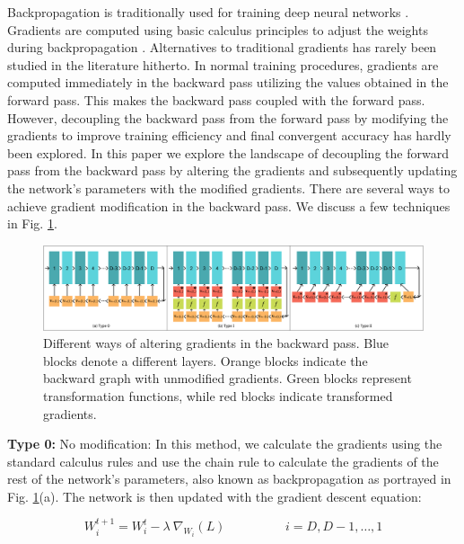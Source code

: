 \documentclass[runningheads]{llncs}
\makeatletter
\def\blfootnote{\xdef\@thefnmark{}\@footnotetext}
\makeatother
\begin{document}
\blfootnote{$^\ast \text{Equal contribution.}$}


Backpropagation is traditionally used for training deep neural networks
\cite{lillicrap2020backpropagation}. Gradients are computed using basic calculus
principles to adjust the weights during backpropagation \cite{lecun1988theoretical}.
Alternatives to traditional gradients has rarely been studied in the literature
hitherto. In normal training procedures, gradients are computed immediately in the
backward pass utilizing the values obtained in the forward pass. This makes the backward
pass coupled with the forward pass. However, decoupling the backward pass from the
forward pass by modifying the gradients to improve training efficiency and final
convergent accuracy has hardly been explored. In this paper we explore the landscape of
decoupling the forward pass from the backward pass by altering the gradients and
subsequently updating the network's parameters with the modified gradients. There are
several ways to achieve gradient modification in the backward pass. We discuss a few
techniques in Fig. \ref{fig:gradient_altering}.



\begin{figure}[t]
\centering
\includegraphics[width=\textwidth]{PGT_Types}
\caption{ Different ways of altering gradients in the backward pass. Blue blocks denote
a different layers. Orange blocks indicate the backward graph with unmodified gradients.
Green blocks represent transformation functions, while red blocks indicate transformed
gradients. }
\label{fig:gradient_altering}
\vspace{-0.5cm}
\end{figure}



\textbf{Type 0:} No modification: In this method, we calculate the gradients using the
standard calculus rules and use the chain rule to calculate the gradients of the rest of
the network's parameters, also known as backpropagation as portrayed in Fig.
\ref{fig:gradient_altering}(a). The network is then updated with the gradient descent
equation:

\begin{equation}
W_i^{t+1} = W_i^t - \lambda\ \nabla_{W_i}(L)
\hspace{2cm}
i=D,D-1,\ldots,1
\end{equation}
\end{document}
